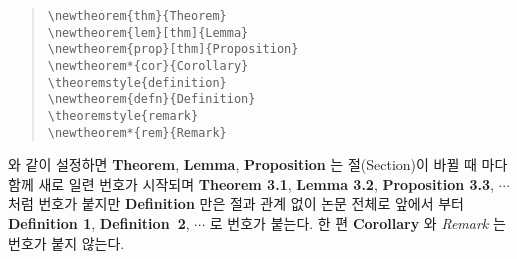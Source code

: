 \documentclass[a4paper,10pt]{amsproc}
\newlength\hunindentlen
\def\gethunindentlen#1{%
 \sbox{\mybox}{\textbf{#1.}}%
 \setlength\hunindentlen{\wd\mybox}%
 \addtolength\hunindentlen{5mm}%
}
\begin{document}
\begin{quote}
\noindent\gethunindentlen{예 4}
\hspace*{-\hunindentlen}\usebox{\mybox}\hspace{4mm}\verb|\newtheorem{thm}{Theorem}| \\
   \verb|\newtheorem{lem}[thm]{Lemma}| \\
   \verb|\newtheorem{prop}[thm]{Proposition}| \\
   \verb|\newtheorem*{cor}{Corollary}| \\
   \verb|\theoremstyle{definition}| \\
   \verb|\newtheorem{defn}{Definition}| \\
   \verb|\theoremstyle{remark}| \\
   \verb|\newtheorem*{rem}{Remark}|
\end{quote}
와 같이 설정하면 \textbf{Theorem}, \textbf{Lemma},
\textbf{Proposition} 는 절(Section)이 바뀔 때 마다 함께 새로 일련
번호가 시작되며 \textbf{Theorem 3.1}, \textbf{Lemma 3.2},
\textbf{Proposition 3.3}, $\cdots$ 처럼 번호가 붙지만
\textbf{Definition} 만은 절과 관계 없이 논문 전체로 앞에서 부터
\textbf{Definition 1}, \textbf{Definition~2}, $\cdots$ 로 번호가
붙는다. 한 편 \textbf{Corollary} 와 \textit{Remark} 는 번호가 붙지
않는다.
\end{document}
